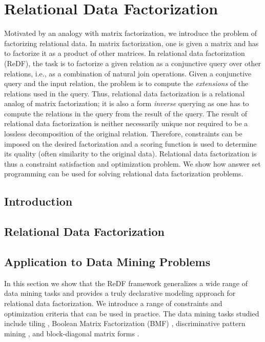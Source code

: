 \chapter{Relational Data Factorization}\label{ch:ReDF}
\newcommand{\redfpath}{chapters/ReDF/tex_files}


Motivated by an analogy with matrix factorization, we introduce the problem of factorizing relational data. In matrix factorization, one is given a matrix and has to factorize it as a product of other matrices. In relational data factorization (ReDF), the task is to factorize a given relation as a conjunctive query over other relations, i.e., as a combination of natural join operations. Given a conjunctive query and the input relation, the problem is to compute the \emph{extensions} of the relations used in the query. Thus, relational data factorization is a relational analog of matrix factorization; it is also a form {\em inverse} querying as one has to compute the relations in the query from the result of the query.  The result of relational data factorization is neither necessarily unique nor required to be a lossless decomposition of the original relation. Therefore, constraints can be imposed on the desired factorization and a scoring function is used to determine its quality (often similarity to the original data). Relational data factorization is thus a constraint satisfaction and optimization problem. We show how answer set programming can be used for solving relational data factorization problems. 


\section{Introduction}
 
\section{Relational Data Factorization}
\label{section:framework}


\section{Application to Data Mining Problems}
\label{section:dm_problems}

In this section we show that the ReDF framework generalizes a wide range of data mining tasks and provides a truly declarative modeling approach for relational data factorization. We introduce a range of constraints and optimization criteria that can be used in practice. The data mining tasks studied include tiling \parencite{tiling},  Boolean Matrix Factorization (BMF) \parencite{dbp}, discriminative pattern mining \parencite{DBLP:conf/pkdd/KnobbeH06}, and block-diagonal matrix forms \parencite{blockdiagonal}.%

